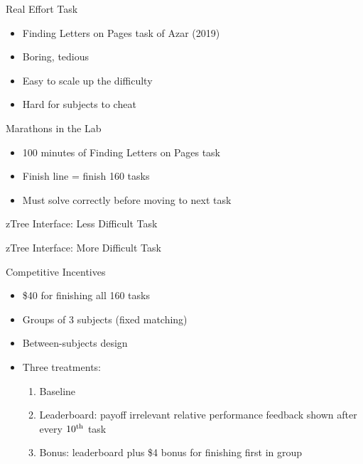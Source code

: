 \documentclass[14pt]{beamer}
\begin{document}
\begin{frame}{Real Effort Task}
\begin{itemize}
	\item Finding Letters on Pages task of Azar (2019)
	\item Boring, tedious
	\item Easy to scale up the difficulty
	\item Hard for subjects to cheat
\end{itemize}
\end{frame}

\begin{frame}{Marathons in the Lab}
\begin{itemize}
	\item 100 minutes of Finding Letters on Pages task
	\item Finish line = finish 160 tasks 
	\item Must solve correctly before moving to next task
\end{itemize}
\end{frame}

\begin{frame}{zTree Interface: Less Difficult Task}
\end{frame}

\begin{frame}{zTree Interface: More Difficult Task}
\end{frame}

\begin{frame}{Competitive Incentives}
\begin{itemize}
	\item \$40 for finishing all 160 tasks 
	\item Groups of 3 subjects (fixed matching)
	\item Between-subjects design
	\item Three treatments:
	\begin{enumerate}
		\item Baseline
		\item Leaderboard: payoff irrelevant relative performance feedback shown after every $10\textsuperscript{th}$ task 
		\item Bonus: leaderboard plus \$4 bonus for finishing first in group
	\end{enumerate}
\end{itemize}
\end{frame}
\end{document}
